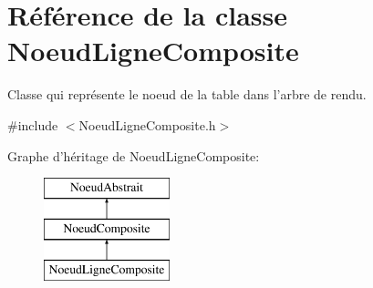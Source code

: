 \hypertarget{class_noeud_ligne_composite}{\section{Référence de la classe Noeud\-Ligne\-Composite}
\label{class_noeud_ligne_composite}
}


Classe qui représente le noeud de la table dans l'arbre de rendu.  




{\ttfamily \#include $<$Noeud\-Ligne\-Composite.\-h$>$}

Graphe d'héritage de Noeud\-Ligne\-Composite\-:\begin{figure}[H]
\begin{center}
\leavevmode
\includegraphics[height=3.000000cm]{class_noeud_ligne_composite}
\end{center}
\end{figure}
